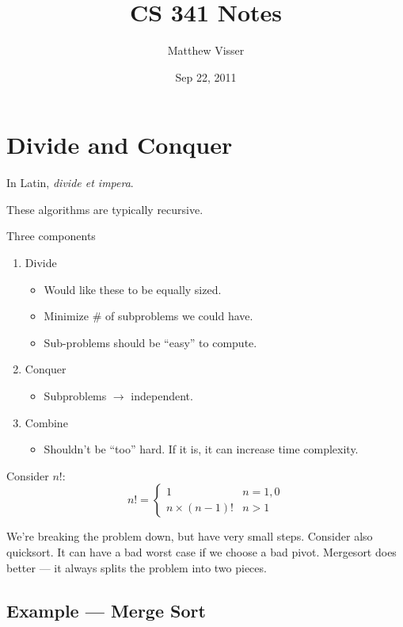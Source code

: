 \documentclass[12pt]{article}
\begin{document}
\title{CS 341 Notes}
\author{Matthew Visser}
\date{Sep 22, 2011}
\maketitle

\section{Divide and Conquer}

In Latin, \textit{divide et impera}.

These algorithms are typically recursive.

Three components
\begin{enumerate}
    \item Divide
        \begin{itemize}
            \item Would like these to be equally sized.
            \item Minimize \# of subproblems we could have.
            \item Sub-problems should be ``easy'' to compute.
        \end{itemize}
    \item Conquer
        \begin{itemize}
            \item Subproblems $\to$ independent.
        \end{itemize}
    \item Combine
        \begin{itemize}
            \item Shouldn't be ``too'' hard. If it is, it can increase time
                complexity.
        \end{itemize}
\end{enumerate}

Consider $n!$:
\[
n! = \begin{cases}
    1 & n=1,0\\
    n \times (n-1)! & n>1
\end{cases}
\]

We're breaking the problem down, but have very small steps.  Consider also
quicksort. It can have a bad worst case if we choose a bad pivot.  Mergesort
does better --- it always splits the problem into two pieces.

\subsection{Example --- Merge Sort}
\end{document}
